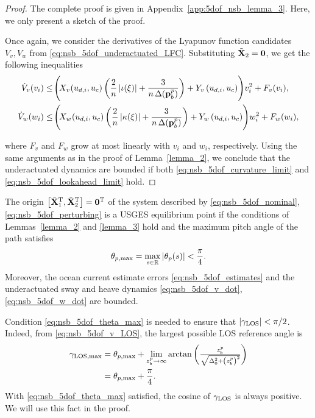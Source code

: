 \begin{proof}
    The complete proof is given in Appendix~\ref{app:5dof_nsb_lemma_3}.
    Here, we only present a sketch of the proof.

    Once again, we consider the derivatives of the Lyapunov function candidates {$V_v, V_w$} from \eqref{eq:nsb_5dof_underactuated_LFC}.
    Substituting $\tilde{\mathbf{X}}_2 = \mathbf{0}$, we get the following inequalities
    \begin{align} 
            \dot{V}_v(v_i) &\leq \!\Bigg(\!X_{v\!}\left(u_{d,i}, u_c\right)\left(\frac{2}{n}\abs{\iota(\xi)} + \frac{3}{n\,\Delta(\mat{p}_b^p)}\right) + Y_v\left(u_{d,i}, u_c\right)\!\Bigg)v_i^2 + F_v(v_i), \\
            \dot{V}_w(w_i) &\leq \!\Bigg(\!X_{w\!}\left(u_{d,i}, u_c\right)\left(\frac{2}{n}\abs{\kappa(\xi)} + \frac{3}{n\,\Delta(\mat{p}_b^p)}\right) + Y_w\left(u_{d,i}, u_c\right)\!\Bigg)w_i^2 + F_w(w_i),
    \end{align}\vspace{-3mm}

    \noindent where $F_v$ and $F_w$ grow at most linearly with $v_i$ and $w_i$, respectively.
    Using the same arguments as in the proof of Lemma~\ref{lemma_2}, we conclude that the underactuated dynamics are bounded if both \eqref{eq:nsb_5dof_curvature_limit} and \eqref{eq:nsb_5dof_lookahead_limit} hold.
\end{proof}

\begin{theorem}
    The origin $\left[\tilde{\mathbf{X}}_1^{\mathrm{T}}, \tilde{\mathbf{X}}_2^{\mathrm{T}}\right] = \mathbf{0}^{\mathrm{T}}$ of the system described by \eqref{eq:nsb_5dof_nominal}, \eqref{eq:nsb_5dof_perturbing} is a USGES equilibrium point if the conditions of Lemmas~\ref{lemma_2} and \ref{lemma_3} hold and the maximum pitch angle of the path satisfies
    \begin{equation}
        \theta_{p, {\rm max}} = \max_{s \in \mathbb{R}} \left|\theta_p(s)\right| < \frac{\pi}{4}.
        \label{eq:nsb_5dof_theta_max}
    \end{equation}
    Moreover, the ocean current estimate errors \eqref{eq:nsb_5dof_estimates} and the underactuated sway and heave dynamics \eqref{eq:nsb_5dof_v_dot}, \eqref{eq:nsb_5dof_w_dot} are bounded.
\end{theorem}

\begin{rmk}
Condition \eqref{eq:nsb_5dof_theta_max} is needed to ensure that $\left|\gamma_{\rm LOS}\right| < \pi/2$.
Indeed, from \eqref{eq:nsb_5dof_v_LOS}, the largest possible LOS reference angle is
\begin{equation}
    \begin{split}
        \gamma_{\rm LOS, max} &= \theta_{p, {\rm max}} + \lim_{z_b^p \rightarrow \infty} \arctan\left(\scale[1]{\frac{z_b^p}{\sqrt{\Delta_0^2 + \left(z_b^p\right)^2}}}\right) \\
        &= \theta_{p, {\rm max}} + \frac{\pi}{4}.
    \end{split}
\end{equation}
With \eqref{eq:nsb_5dof_theta_max} satisfied, the cosine of $\gamma_{\rm LOS}$ is always positive. We will use this fact in the proof.
\end{rmk}

